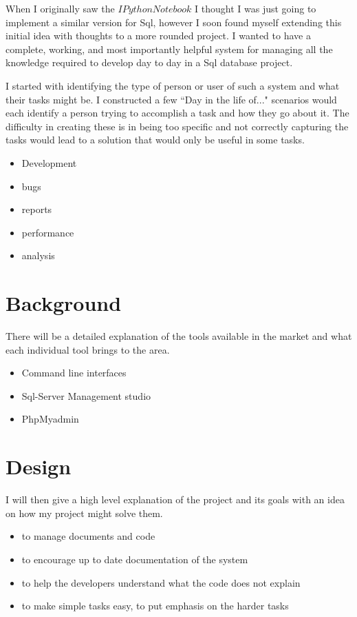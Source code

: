 \documentclass[a4paper, 11pt]{article}
\begin{document}
When I originally saw the $IPython Notebook$ I thought I was just going to
implement a similar version for Sql, however I soon found myself extending this
initial idea with thoughts to a more rounded project. I wanted to have a
complete, working, and most importantly helpful system for managing all the
knowledge required to develop day to day in a Sql database project.

I started with identifying the type of person or user of such a system and what
their tasks might be. I constructed a few ``Day in the life of..." scenarios
would each identify a person trying to accomplish a task and how they go about
it. The difficulty in creating these is in being too specific and not correctly
capturing the tasks would lead to a solution that would only be useful in
some tasks.

\begin{itemize}
  \item{Development}
  \item{bugs}
  \item{reports}
  \item{performance}
  \item{analysis}
\end{itemize}

\section{Background}

There will be a detailed explanation of the tools available in the market
and what each individual tool brings to the area.

\begin{itemize}
  \item{Command line interfaces}
  \item{Sql-Server Management studio}
  \item{PhpMyadmin}
\end{itemize}

\section{Design}

I will then give a high level explanation of the project and its goals with an
idea on how my project might solve them.

\begin{itemize}
  \item{to manage documents and code}
  \item{to encourage up to date documentation of the system}
  \item{to help the developers understand what the code does not explain}
  \item{to make simple tasks easy, to put emphasis on the harder tasks}
\end{itemize}
\end{document}
